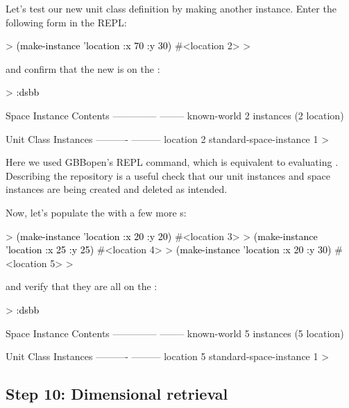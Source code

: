 \documentclass[10pt,twoside,english,pdftex]{article}
\begin{document}
%
%
Let's test our new  unit class definition by making another
instance.  Enter the following form in the REPL:
%
\begin{example}\color{darkergray}%
  > \textcolor{black}{(make-instance 'location :x 70 :y 30)}
  #<location 2>
  >
\end{example}
%
%
and confirm that the new  is on the :
%
\begin{example}\color{darkergray}%
  > \textcolor{black}{:dsbb}
  
  Space Instance                Contents
  --------------                --------
  known-world                   2 instances (2 location)

  Unit Class                    Instances
  ----------                    ---------
  location                              2
  standard-space-instance               1
  >
\end{example}
%
Here we used GBBopen's  REPL command, which is equivalent to
evaluating .  Describing the repository
is a useful check that our unit instances and space instances are being
created and deleted as intended.

%
Now, let's populate the  with a few more s:
%
\begin{example}\color{darkergray}%
  > \textcolor{black}{(make-instance 'location :x 20 :y 20)}
  #<location 3>
  > \textcolor{black}{(make-instance 'location :x 25 :y 25)}
  #<location 4>
  > \textcolor{black}{(make-instance 'location :x 20 :y 30)}
  #<location 5>
  >
\end{example}
%
and verify that they are all on the :
%
\begin{example}\color{darkergray}%
  > \textcolor{black}{:dsbb}
  
  Space Instance                Contents
  --------------                --------
  known-world                   5 instances (5 location)

  Unit Class                    Instances
  ----------                    ---------
  location                              5
  standard-space-instance               1
  >
\end{example}

\subsection*{Step 10: Dimensional retrieval}
\end{document}

